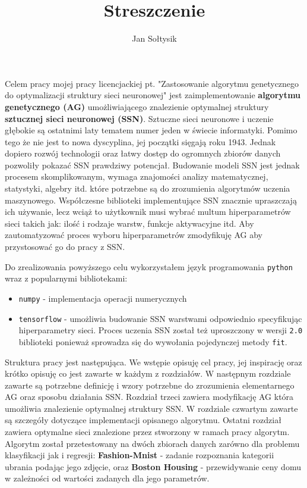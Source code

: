 \documentclass{article}
\title{Streszczenie}
\author{Jan Sołtysik}
\begin{document}
\maketitle
Celem pracy mojej pracy licencjackiej pt. "Zastosowanie algorytmu genetycznego do optymalizacji
struktury sieci neuronowej" jest zaimplementowanie \textbf{algorytmu genetycznego (AG)}
umożliwiającego znalezienie optymalnej struktury  \textbf{sztucznej sieci neuronowej (SSN)}.
Sztuczne sieci neuronowe i uczenie głębokie są ostatnimi laty tematem numer jeden w świecie
informatyki. Pomimo tego że nie jest to nowa dyscyplina, jej początki sięgają roku 1943.
Jednak dopiero rozwój technologii oraz łatwy dostęp do ogromnych zbiorów danych pozwoliły
pokazać SSN prawdziwy potencjał. Budowanie modeli SSN jest jednak procesem skomplikowanym,
wymaga znajomości analizy matematycznej, statystyki, algebry itd. które potrzebne są do 
zrozumienia algorytmów uczenia maszynowego. Współczesne biblioteki implementujące SSN znacznie
upraszczają ich używanie, lecz wciąż to użytkownik musi wybrać multum hiperparametrów sieci
takich jak: ilość i rodzaje warstw, funkcje aktywacyjne itd. Aby zautomatyzować proces
wyboru hiperparametrów zmodyfikuję AG aby przystosować go do pracy z SSN.

Do zrealizowania powyższego celu wykorzystałem język programowania 
\texttt{python} wraz z popularnymi bibliotekami: 
\begin{itemize}
\item \texttt{numpy} - implementacja operacji numerycznych
\item \texttt{tensorflow} - umożliwia budowanie SSN warstwami odpowiednio specyfikując
hiperparametry sieci. Proces uczenia SSN został też uproszczony w wersji \texttt{2.0} biblioteki
ponieważ sprowadza się do wywołania pojedynczej metody \texttt{fit}.
\end{itemize}

Struktura pracy jest następująca. We wstępie opisuję cel pracy, jej inspirację oraz krótko
opisuję co jest zawarte w każdym z rozdziałów. W następnym rozdziale zawarte są potrzebne
definicję i wzory potrzebne do zrozumienia elementarnego AG oraz sposobu działania SSN.
Rozdział trzeci zawiera modyfikację AG która umożliwia znalezienie optymalnej struktury
SSN. W rozdziale czwartym zawarte są szczegóły dotyczące implementacji opisanego algorytmu.
Ostatni rozdział zawiera optymalne sieci znalezione przez stworzony w ramach pracy 
algorytm. Algorytm został przetestowany na dwóch zbiorach danych zarówno
dla problemu klasyfikacji jak i regresji: \textbf{Fashion-Mnist} - zadanie rozpoznania
kategorii ubrania podając jego zdjęcie, oraz \textbf{Boston Housing} - przewidywanie
ceny domu w zależności od wartości zadanych dla jego parametrów.
\end{document}
